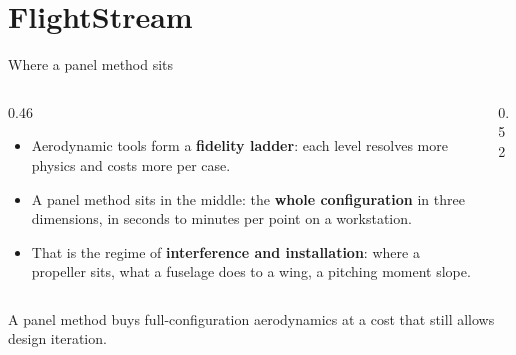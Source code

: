 %
%

\section{FlightStream}

\begin{frame}{Where a panel method sits}
\begin{columns}[T]
\begin{column}{0.46\textwidth}
\begin{itemize}\small
  \item Aerodynamic tools form a \textbf{fidelity ladder}: each level resolves
        more physics and costs more per case.
  \item A panel method sits in the middle: the \textbf{whole configuration} in
        three dimensions, in seconds to minutes per point on a workstation.
  \item That is the regime of \textbf{interference and installation}: where a
        propeller sits, what a fuselage does to a wing, a pitching moment slope.
\end{itemize}
\end{column}
\begin{column}{0.52\textwidth}
\end{column}
\end{columns}
\begin{takeaway}A panel method buys full-configuration aerodynamics at a cost
that still allows design iteration.\end{takeaway}
\end{frame}

